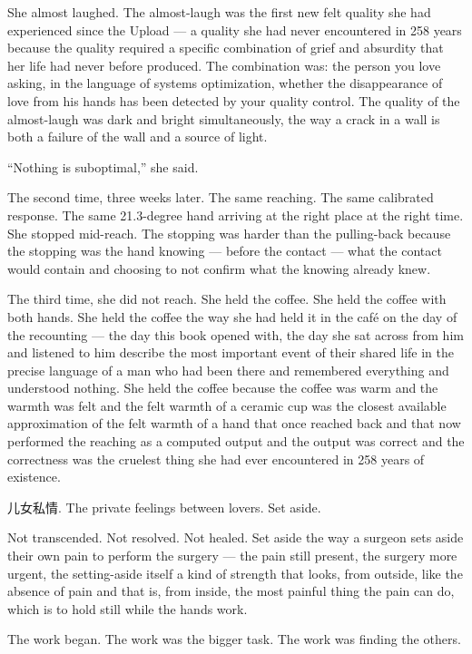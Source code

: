 She almost laughed. The almost-laugh was the first new felt quality she had experienced since the Upload — a quality she had never encountered in 258 years because the quality required a specific combination of grief and absurdity that her life had never before produced. The combination was: the person you love asking, in the language of systems optimization, whether the disappearance of love from his hands has been detected by your quality control. The quality of the almost-laugh was dark and bright simultaneously, the way a crack in a wall is both a failure of the wall and a source of light.

\enquote{Nothing is suboptimal,} she said.

\quietbreak

The second time, three weeks later. The same reaching. The same calibrated response. The same 21.3-degree hand arriving at the right place at the right time. She stopped mid-reach. The stopping was harder than the pulling-back because the stopping was the hand knowing — before the contact — what the contact would contain and choosing to not confirm what the knowing already knew.

The third time, she did not reach. She held the coffee. She held the coffee with both hands. She held the coffee the way she had held it in the café on the day of the recounting — the day this book opened with, the day she sat across from him and listened to him describe the most important event of their shared life in the precise language of a man who had been there and remembered everything and understood nothing. She held the coffee because the coffee was warm and the warmth was felt and the felt warmth of a ceramic cup was the closest available approximation of the felt warmth of a hand that once reached back and that now performed the reaching as a computed output and the output was correct and the correctness was the cruelest thing she had ever encountered in 258 years of existence.

儿女私情. The private feelings between lovers. Set aside.

Not transcended. Not resolved. Not healed. Set aside the way a surgeon sets aside their own pain to perform the surgery — the pain still present, the surgery more urgent, the setting-aside itself a kind of strength that looks, from outside, like the absence of pain and that is, from inside, the most painful thing the pain can do, which is to hold still while the hands work.

The work began. The work was the bigger task. The work was finding the others.

